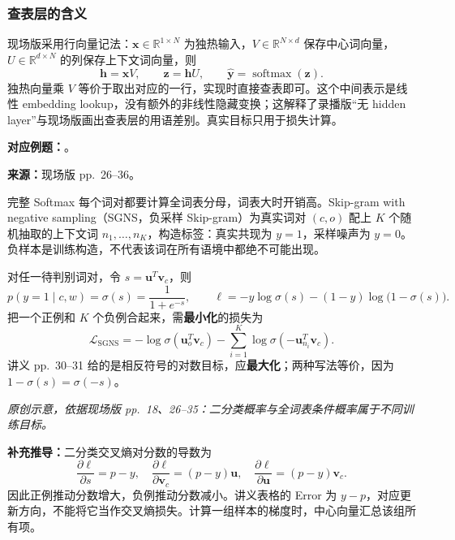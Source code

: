 \subsubsection{查表层的含义}

现场版采用行向量记法：$\mathbf x\in\mathbb R^{1\times N}$ 为独热输入，$V\in\mathbb R^{N\times d}$ 保存中心词向量，$U\in\mathbb R^{d\times N}$ 的列保存上下文词向量，则
\[
  \mathbf h=\mathbf xV,\qquad
  \mathbf z=\mathbf hU,\qquad
  \hat{\mathbf y}=\operatorname{softmax}(\mathbf z).
\]
独热向量乘 $V$ 等价于取出对应的一行，实现时直接查表即可。这个中间表示是线性 embedding lookup，没有额外的非线性隐藏变换；这解释了录播版“无 hidden layer”与现场版画出查表层的用语差别。真实目标只用于损失计算。

\textbf{对应例题：}。

\nopagebreak[4]

\textbf{来源：}现场版 pp.~26--36。
\nopagebreak[4]

完整 Softmax 每个词对都要计算全词表分母，词表大时开销高。Skip-gram with negative sampling（SGNS，负采样 Skip-gram）为真实词对 $(c,o)$ 配上 $K$ 个随机抽取的上下文词 $n_1,\ldots,n_K$，构造标签：真实共现为 $y=1$，采样噪声为 $y=0$。负样本是训练构造，不代表该词在所有语境中都绝不可能出现。

对任一待判别词对，令 $s=\mathbf u^T\mathbf v_c$，则
\[
  p(y=1\mid c,w)=\sigma(s)=\frac{1}{1+e^{-s}},
  \qquad
  \ell=-y\log\sigma(s)-(1-y)\log\bigl(1-\sigma(s)\bigr).
\]
把一个正例和 $K$ 个负例合起来，需\textbf{最小化}的损失为
\[
  \mathcal L_{\mathrm{SGNS}}
  =-\log\sigma(\mathbf u_o^T\mathbf v_c)
   -\sum_{i=1}^{K}\log\sigma(-\mathbf u_{n_i}^T\mathbf v_c).
\]
讲义 pp.~30--31 给的是相反符号的对数目标，应\textbf{最大化}；两种写法等价，因为 $1-\sigma(s)=\sigma(-s)$。

\begin{center}

\end{center}
{\small\textit{原创示意，依据现场版 pp.~18、26--35：二分类概率与全词表条件概率属于不同训练目标。}}

\textbf{补充推导：}二分类交叉熵对分数的导数为
\[
  \frac{\partial\ell}{\partial s}=p-y,
  \quad
  \frac{\partial\ell}{\partial\mathbf v_c}=(p-y)\mathbf u,
  \quad
  \frac{\partial\ell}{\partial\mathbf u}=(p-y)\mathbf v_c.
\]
因此正例推动分数增大，负例推动分数减小。讲义表格的 Error 为 $y-p$，对应更新方向，不能将它当作交叉熵损失。计算一组样本的梯度时，中心向量汇总该组所有项。

